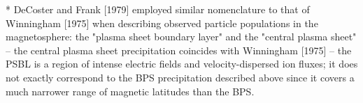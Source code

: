 
* DeCoster and Frank [1979] employed similar nomenclature to that of
Winningham [1975] when describing observed particle populations in 
the magnetosphere: the "plasma sheet boundary layer" and
the "central plasma sheet"
 -- the central plasma sheet precipitation coincides with Winningham
 [1975]
 -- the PSBL is a region of intense electric fields and
 velocity-dispersed ion fluxes; it does not exactly correspond to the BPS 
 precipitation described above since it covers a much narrower range of 
 magnetic latitudes than the BPS.
